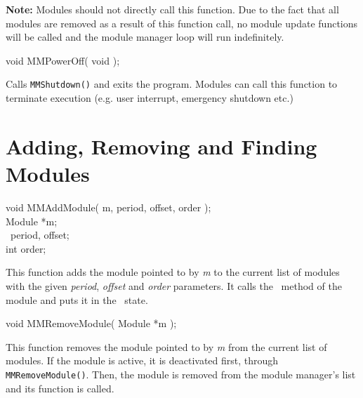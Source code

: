 {\bf Note:} Modules should not directly call this function. Due to the fact that
all modules are removed as a result of this function call, no module update
functions will be called and the module manager loop will run indefinitely.

\begin{prototype}
void MMPowerOff( void );
\end{prototype}

Calls {\tt MMShutdown()} and exits the program. Modules can call this
function to terminate execution (e.g. user interrupt, emergency shutdown
etc.)




\section{Adding, Removing and Finding Modules}
\label{sec:mm_add_remove}

\begin{prototype}
void MMAddModule( m, period, offset, order ); \\
Module *m; \\
\mmstep\ period, offset; \\
int order;
\end{prototype}

This function adds the module pointed to by {\it *m} to the current list of
modules with the given {\it period}, {\it offset} and {\it order}
parameters. It calls the \initFN\ method of the module and puts it in the
\ModuleInactive\ state.

\begin{prototype}
void MMRemoveModule( Module *m );
\end{prototype}

This function removes the module pointed to by {\it *m} from the current
list of modules. If the module is active, it is deactivated first, through
{\tt MMRemoveModule()}. Then, the module is removed from the module
manager's list and its \uninitFN function is called.

